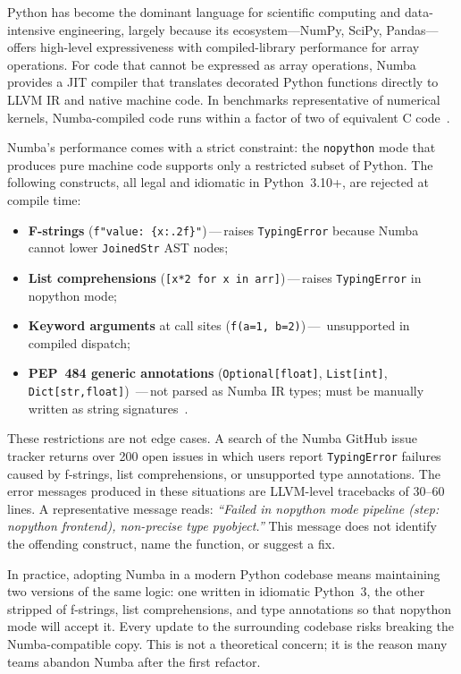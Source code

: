 \documentclass[journal]{IEEEtran}
\begin{document}
Python has become the dominant language for scientific computing and
data-intensive engineering, largely because its ecosystem—NumPy, SciPy,
Pandas—offers high-level expressiveness with compiled-library performance
for array operations. For code that cannot be expressed as array operations,
Numba~\cite{lam2015numba} provides a JIT compiler that translates decorated
Python functions directly to LLVM IR and native machine code. In benchmarks
representative of numerical kernels, Numba-compiled code runs within a factor
of two of equivalent C code~\cite{zhang2024python, liu2017performance}.

Numba's performance comes with a strict constraint: the \texttt{nopython}
mode that produces pure machine code supports only a restricted subset of
Python. The following constructs, all legal and idiomatic in Python~3.10+,
are rejected at compile time:

\begin{itemize}
  \item \textbf{F-strings} (\texttt{f"value: \{x:.2f\}"})\,—\,raises
    \texttt{TypingError} because Numba cannot lower \texttt{JoinedStr} AST
    nodes;
  \item \textbf{List comprehensions} (\texttt{[x*2 for x in arr]})\,—\,raises
    \texttt{TypingError} in nopython mode;
  \item \textbf{Keyword arguments} at call sites (\texttt{f(a=1, b=2)})\,—\,
    unsupported in compiled dispatch;
  \item \textbf{PEP~484 generic annotations}
    (\texttt{Optional[float]}, \texttt{List[int]}, \texttt{Dict[str,float]})\,
    —\,not parsed as Numba IR types; must be manually written as string
    signatures~\cite{vanrossum2014pep484}.
\end{itemize}

These restrictions are not edge cases. A search of the Numba GitHub issue
tracker returns over 200 open issues in which users report \texttt{TypingError}
failures caused by f-strings, list comprehensions, or unsupported type
annotations. The error messages produced in these situations are LLVM-level
tracebacks of 30--60 lines. A representative message reads:
\textit{``Failed in nopython mode pipeline (step: nopython frontend),
non-precise type pyobject.''} This message does not identify the offending
construct, name the function, or suggest a fix.

In practice, adopting Numba in a modern Python codebase means maintaining
two versions of the same logic: one written in idiomatic Python~3, the other
stripped of f-strings, list comprehensions, and type annotations so that
nopython mode will accept it. Every update to the surrounding codebase risks
breaking the Numba-compatible copy. This is not a theoretical concern; it is
the reason many teams abandon Numba after the first refactor.
\end{document}
